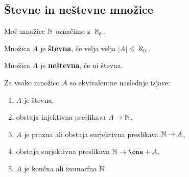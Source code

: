 \subsection{Števne in neštevne množice}

Moč množice $\mathbb{N}$ označimo z $\aleph_0$.

\begin{definicija}
  Množica $A$ je \textbf{števna}, če velja velja $|A| \leq \aleph_0$.
\end{definicija}

\begin{definicija}
  Množica $A$ je \textbf{neštevna}, če ni števna.
\end{definicija}

\begin{izrek}
  Za vsako množico $A$ so ekvivalentne naslednje izjave:
  \begin{enumerate}
  \item $A$ je števna,
  \item obstaja injektivna preslikava $A \to \mathbb{N}$,
  \item $A$ je prazna ali obstaja surjektivna preslikava $\mathbb{N} \to A$,
  \item obstaja surjektivna preslikava $\NN \to \one + A$,
  \item $A$ je končna ali izomorfna $\mathbb{N}$.
  \end{enumerate}
\end{izrek}

